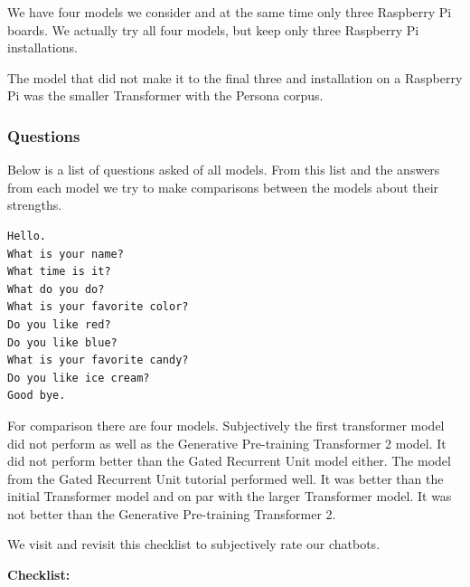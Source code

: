 
We have four models we consider and at the same time only three Raspberry Pi boards. We actually try all four models, but keep only three Raspberry Pi installations. 


The model that did not make it to the final three and installation on a Raspberry Pi was the smaller Transformer with the Persona corpus.

\subsubsection*{Questions}
Below is a list of questions asked of all models. From this list and the answers from each model we try to make comparisons between the models about their strengths.

\begin{verbatim}
Hello.
What is your name? 
What time is it?
What do you do?
What is your favorite color?
Do you like red?
Do you like blue?
What is your favorite candy?
Do you like ice cream?
Good bye.
\end{verbatim}

For comparison there are four models. Subjectively the first transformer model did not perform as well as the Generative Pre-training Transformer 2 model. It did not perform better than the Gated Recurrent Unit model either. The model from the Gated Recurrent Unit tutorial performed well. It was better than the initial Transformer model and on par with the larger Transformer model. It was not better than the Generative Pre-training Transformer 2.

We visit and revisit this checklist to subjectively rate our chatbots.

\noindent \textbf{Checklist:} 

